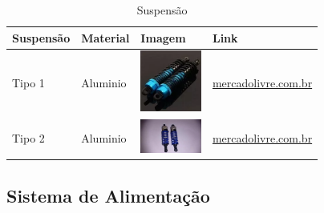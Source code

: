   \begin{table}[!htbp]
  \begin{center}
  \caption{Suspensão}
  \begin{tabular}{|p{3cm}|p{3cm}|p{2cm}|p{4cm}|}
  \hline
  \textbf{Suspensão} & \textbf{Material} & \textbf{Imagem} & \textbf{Link}\\\hline\hline
  Tipo 1 & Aluminio & \includegraphics[width=2cm]{figuras/suspensao_aluminio_1.eps} & \href{http://produto.mercadolivre.com.br/MLB-689668697-par-amortecedor-aluminio-hsp-106004-06038-06062-rc-110-97mm-_JM}{mercadolivre.com.br}\\\hline
  Tipo 2 & Aluminio & \includegraphics[width=2cm]{figuras/suspensao_aluminio_2.eps} & \href{http://produto.mercadolivre.com.br/MLB-722851070-par-de-amortecedor-75mm-para-automodelo-110-_JM}{mercadolivre.com.br}\\\hline
  \end{tabular}
  \end{center}
  \end{table}

  \subsection{Sistema de Alimentação}

